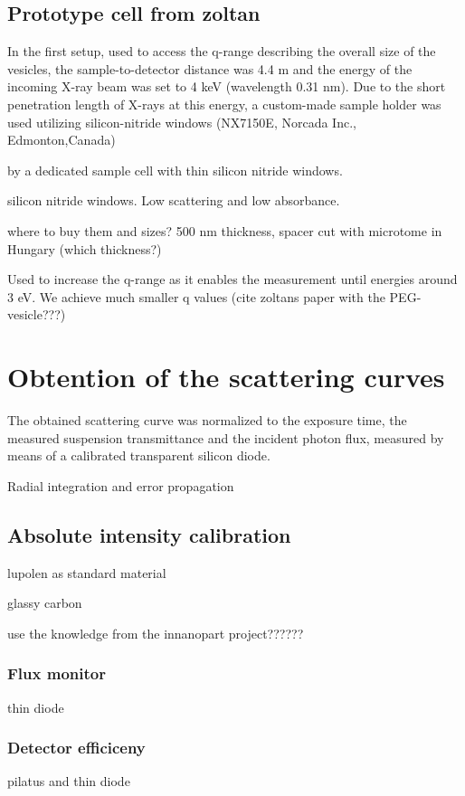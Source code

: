 \subsection{Prototype cell from zoltan}

In the first setup, used to access the q-range describing the overall size of the vesicles, the sample-to-detector distance was 4.4 m and the energy of the incoming X-ray beam was set to 4 keV (wavelength 0.31 nm). Due to the short penetration length of X-rays at this energy, a custom-made sample holder was used utilizing silicon-nitride windows (NX7150E, Norcada Inc., Edmonton,Canada)

by a dedicated sample cell with thin silicon nitride windows. 

silicon nitride windows. Low scattering and low absorbance. 

where to buy them and sizes? 500 nm thickness, spacer cut with microtome in Hungary (which thickness?)

Used to increase the q-range as it enables the measurement until energies around 3 eV. We achieve much smaller q values (cite zoltans paper with the PEG-vesicle???)

\section{Obtention of the scattering curves}

The obtained scattering curve was normalized to the exposure time, the measured suspension transmittance and the incident photon flux, measured by means of a calibrated transparent silicon diode. 

Radial integration and error propagation

\subsection{Absolute intensity calibration}

lupolen as standard material \cite{kratky_absolute_1966,shaffer_calibration_1974}

glassy carbon \cite{perret_glassy_1972}

use the knowledge from the innanopart project??????
\subsubsection{Flux monitor}
thin diode
\subsubsection{Detector efficiceny}
pilatus and thin diode





















